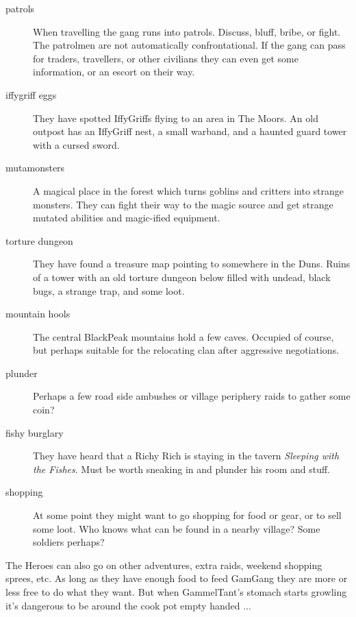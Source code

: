 \begin{description}

    \item[patrols] When travelling the gang runs into patrols. Discuss, bluff, bribe, or fight. The patrolmen are not automatically confrontational. If the gang can pass for traders, travellers, or other civilians they can even get some information, or an escort on their way.

    \item[iffygriff eggs] They have spotted IffyGriffs flying to an area in The Moors. An old outpost has an IffyGriff nest, a small warband, and a haunted guard tower with a cursed sword.

    \item[mutamonsters] A magical place in the forest which turns goblins and critters into strange monsters. They can fight their way to the magic source and get strange mutated abilities and magic-ified equipment.

    \item[torture dungeon] They have found a treasure map pointing to somewhere in the Duns. Ruins of a tower with an old torture dungeon below filled with undead, black bugs, a strange trap, and some loot.
    
    \item[mountain hools] The central BlackPeak mountains hold a few caves. Occupied of course, but perhaps suitable for the relocating clan after aggressive negotiations.

    \item[plunder] Perhaps a few road side ambushes or village periphery raids to gather some coin?

    \item[fishy burglary] They have heard that a Richy Rich is staying in the tavern \emph{Sleeping with the Fishes}. Must be worth sneaking in and plunder his room and stuff.

    \item[shopping] At some point they might want to go shopping for food or gear, or to sell some loot. Who knows what can be found in a nearby village? Some soldiers perhaps?

\end{description}

\noindent The Heroes can also go on other adventures, extra raids, weekend shopping sprees, etc. As long as they have enough food to feed GamGang they are more or less free to do what they want. But when GammelTant's stomach starts growling it's dangerous to be around the cook pot empty handed ...


